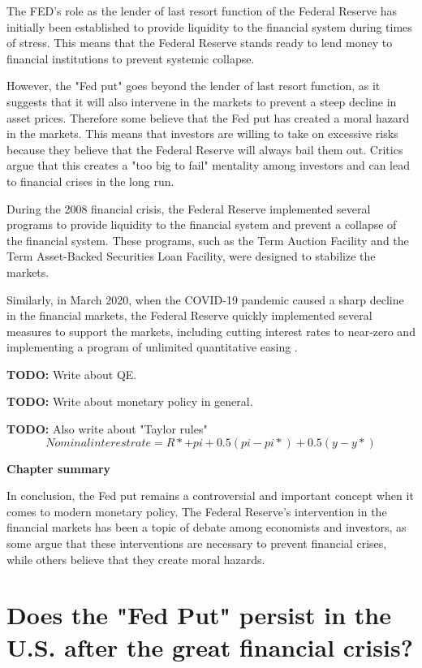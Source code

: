 The FED's role as the lender of last resort function of the Federal Reserve has initially been established to provide liquidity to the financial system during times of stress.  \parencite{Holland91}
This means that the Federal Reserve stands ready to lend money to financial institutions to prevent systemic collapse. 

However, the "Fed put" goes beyond the lender of last resort function,  as it suggests that it will also intervene in the markets to prevent a steep decline in asset prices.
Therefore some believe that the Fed put has created a moral hazard in the markets.  \parencite{WSJ7} 
This means that investors are willing to take on excessive risks because they believe that the Federal Reserve will always bail them out.  
Critics argue that this creates a "too big to fail" mentality among investors and can lead to financial crises in the long run. 

During the 2008 financial crisis,  the Federal Reserve implemented several programs to provide liquidity to the financial system and prevent a collapse of the financial system. 
These programs,  such as the Term Auction Facility and the Term Asset-Backed Securities Loan Facility,  were designed to stabilize the markets.  

Similarly,  in March 2020, when the COVID-19 pandemic caused a sharp decline in the financial markets,  the Federal Reserve quickly implemented several measures to support the markets,  including cutting interest rates to near-zero and implementing a program of unlimited quantitative easing \parencite{FED21}.

\textbf{TODO:} Write about QE.

\textbf{TODO:} Write about monetary policy in general.

\textbf{TODO:} Also write about "Taylor rules"
\[ Nominal interest rate = R* + pi + 0.5(pi - pi*) + 0.5(y - y*) \]

\textbf{Chapter summary}

In conclusion,  the Fed put remains a controversial and important concept when it comes to modern monetary policy.  
The Federal Reserve's intervention in the financial markets has been a topic of debate among economists and investors,  as some argue that these interventions are necessary to prevent financial crises,  while others believe that they create moral hazards. 

\chapter{Does the "Fed Put" persist in the U.S.  after the great financial crisis?}

